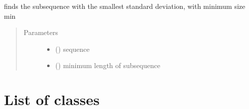 \documentclass[letterpaper,10pt,english]{sphinxmanual}
\begin{document}

\begin{fulllineitems}
\label{\detokenize{cdmft:pyqcm.cdmft.moving_std}}
\sphinxAtStartPar
finds the subsequence with the smallest standard deviation, with minimum size min
\begin{quote}\begin{description}
\item[{Parameters}] \leavevmode\begin{itemize}
\item {} 
\sphinxAtStartPar
{} (\sphinxstyleliteralemphasis{\sphinxupquote{{[}}}\sphinxstyleliteralemphasis{\sphinxupquote{{]}}}) \textendash{} sequence

\item {} 
\sphinxAtStartPar
{} () \textendash{} minimum length of subsequence

\end{itemize}

\end{description}\end{quote}

\end{fulllineitems}



\section{List of classes}
\label{\detokenize{cdmft:list-of-classes}}
\end{document}
